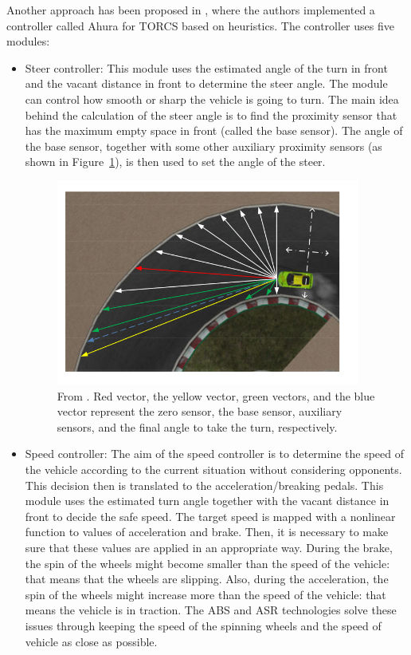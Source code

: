 Another approach has been proposed in \cite{ahura}, where the authors implemented a controller called Ahura for TORCS based on heuristics.
The controller uses five modules: 
\begin{itemize}
\item Steer controller: This module uses the estimated angle
of the turn in front and the vacant distance in front to determine the steer angle. The module can control how smooth or sharp the vehicle is going to turn.
The main idea behind the calculation of the steer angle is to find the proximity sensor that has the maximum empty space in front (called the base sensor). The angle of the base sensor, together with some other auxiliary proximity sensors (as shown in Figure~\ref{fig:ahura-steer}), is then used to set the angle of the steer.
\begin{figure}
 \centering
  \captionsetup{width=10cm}
  \includegraphics[width=10cm]{./img/ahura-steer}
  \caption{From \cite{ahura}. Red vector, the yellow vector, green vectors, and the blue vector represent the zero sensor, the base sensor, auxiliary sensors, and the final angle to take the turn, respectively.}
   \label{fig:ahura-steer}
\end{figure}
\item Speed controller: The aim of the speed controller is to determine the speed of the vehicle according to the current situation without considering opponents. This decision then is translated to the acceleration/breaking pedals. This module uses the estimated turn angle together with the vacant distance in front to decide the safe speed.
The target speed is mapped with a nonlinear function to values of acceleration and brake. Then, it is necessary to make sure that these values are applied in an appropriate way.  During the brake, the spin of the wheels might become smaller than the speed of the vehicle: that means that the wheels are slipping. Also, during the acceleration, the spin of the wheels might increase more than the speed of the vehicle: that means the vehicle is in traction. The ABS and ASR technologies solve these issues through keeping the speed of the spinning wheels and the speed of vehicle as close as possible.

\end{itemize}
